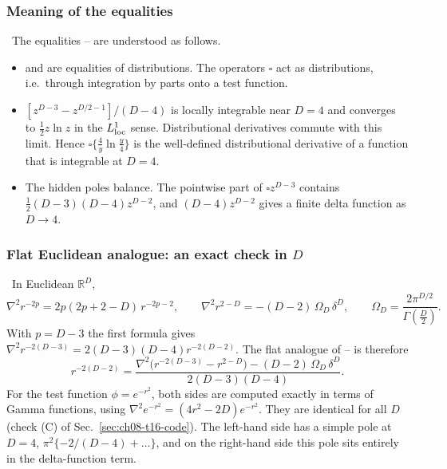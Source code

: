 \subsubsection{Meaning of the equalities}
\tA\ The equalities -- are understood as follows.
\begin{itemize}[leftmargin=*,itemsep=2pt]
\item {} and  are equalities of distributions. The operators $\square$ act as distributions, i.e.\ through integration by parts onto a test function.
\item $[z^{D-3}-z^{D/2-1}]/(D-4)$ is locally integrable near $D=4$ and converges to $\tfrac12z\ln z$ in the $L^1_{\rm loc}$ sense.
Distributional derivatives commute with this limit. Hence $\square\{\frac4y\ln\frac y4\}$ is the well-defined distributional derivative of a function that is integrable at $D=4$.
\item The hidden poles balance. The pointwise part of $\square z^{D-3}$ contains $\tfrac12(D-3)(D-4)z^{D-2}$, and $(D-4)z^{D-2}$ gives a finite delta function as $D\to4$.
\end{itemize}

\subsubsection{Flat Euclidean analogue: an exact check in $D$}
\label{sec:ch08-flat}
\tC\ In Euclidean $\mathbb R^D$,
\[
\nabla^2r^{-2p}=2p(2p+2-D)\,r^{-2p-2},\qquad \nabla^2r^{2-D}=-(D-2)\,\Omega_D\,\delta^D,\qquad \Omega_D=\frac{2\pi^{D/2}}{\Gamma(\frac D2)} .
\]
With $p=D-3$ the first formula gives $\nabla^2r^{-2(D-3)}=2(D-3)(D-4)r^{-2(D-2)}$. The flat analogue of -- is therefore
\begin{equation}
r^{-2(D-2)}=\frac{\nabla^2\big(r^{-2(D-3)}-r^{2-D}\big)-(D-2)\,\Omega_D\,\delta^D}{2(D-3)(D-4)} .
\label{eq:ch08-flat}
\end{equation}
For the test function $\phi=e^{-r^2}$, both sides are computed exactly in terms of Gamma functions, using $\nabla^2e^{-r^2}=(4r^2-2D)e^{-r^2}$.
They are identical for all $D$ (check (C) of Sec.~\ref{sec:ch08-t16-code}).
The left-hand side has a simple pole at $D=4$, $\pi^2\{-2/(D-4)+\ldots\}$, and on the right-hand side this pole sits entirely in the delta-function term.

